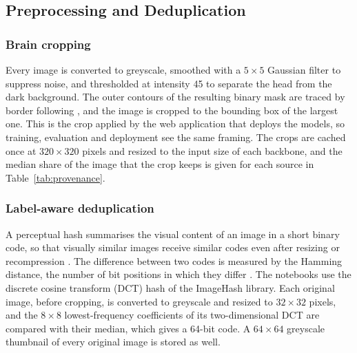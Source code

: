 \documentclass[a4paper,fleqn]{cas-sc}
\begin{document}
\subsection{Preprocessing and Deduplication}
\label{sec:preproc}

\subsubsection{Brain cropping}
\label{sec:crop}

Every image is converted to greyscale, smoothed with a $5\times 5$ Gaussian filter to suppress noise, and thresholded at intensity 45 to separate the head from the dark background. The outer contours of the resulting binary mask are traced by border following \citep{suzuki1985}, and the image is cropped to the bounding box of the largest one. This is the crop applied by the web application that deploys the models, so training, evaluation and deployment see the same framing. The crops are cached once at $320\times 320$ pixels and resized to the input size of each backbone, and the median share of the image that the crop keeps is given for each source in Table~\ref{tab:provenance}.

\subsubsection{Label-aware deduplication}
\label{sec:dedup}

A perceptual hash summarises the visual content of an image in a short binary code, so that visually similar images receive similar codes even after resizing or recompression \citep{monga2006}. The difference between two codes is measured by the Hamming distance, the number of bit positions in which they differ \citep{hamming1950}. The notebooks use the discrete cosine transform (DCT) hash of the ImageHash library. Each original image, before cropping, is converted to greyscale and resized to $32\times 32$ pixels, and the $8\times 8$ lowest-frequency coefficients of its two-dimensional DCT are compared with their median, which gives a 64-bit code. A $64\times 64$ greyscale thumbnail of every original image is stored as well.
\end{document}
